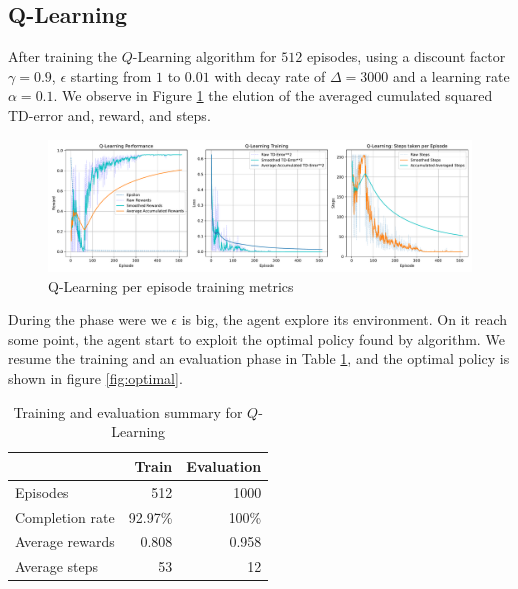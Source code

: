 \subsection{Q-Learning}
After training the $Q$-Learning algorithm for $512$ episodes, using a discount factor $\gamma=0.9$, $\epsilon$ starting from $1$ to $0.01$ with decay rate of $\Delta=3000$ and a learning rate $\alpha=0.1$. We observe in Figure \ref{fig:qlog} the elution of the averaged cumulated squared TD-error and, reward, and steps.
\begin{figure}[H]
	\centering
	\includegraphics[width=\linewidth]{figures/QLearning_episode.pdf}
	\caption{Q-Learning per episode training metrics}
	\label{fig:qlog}
\end{figure}
During the phase were we $\epsilon$ is big, the agent explore its environment. On it reach some point, the agent start to exploit the optimal policy found by algorithm. We resume the training and an evaluation phase in Table \ref{tab:ql}, and the optimal policy is shown in figure \ref{fig:optimal}.
\begin{table}
	\centering
	\begin{tabular}{@{}lrr@{}}
		\cmidrule(l){2-3}
		& Train & Evaluation \\ \midrule
		Episodes        &  512      &  1000          \\
		Completion rate &   92.97\%    &  100\%           \\
		Average rewards &   0.808    &    0.958        \\
		Average steps   &    53   &     12       \\ \bottomrule
	\end{tabular}
	\caption{Training and evaluation summary for {$Q$-Learning}}
	\label{tab:ql}
\end{table}

